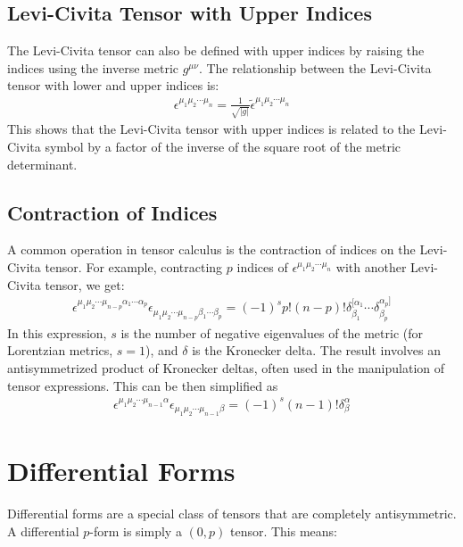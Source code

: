 \documentclass[12pt]{book}
\begin{document}
\subsection{Levi-Civita Tensor with Upper Indices}

The Levi-Civita tensor can also be defined with upper indices by raising the indices using the inverse metric \( g^{\mu\nu} \). The relationship between the Levi-Civita tensor with lower and upper indices is:
\begin{align}
\epsilon^{\mu_1 \mu_2 \cdots \mu_n} = \frac{1}{\sqrt{|g|}} \tilde{\epsilon}^{\mu_1 \mu_2 \cdots \mu_n}
\end{align}
This shows that the Levi-Civita tensor with upper indices is related to the Levi-Civita symbol by a factor of the inverse of the square root of the metric determinant.

\subsection{Contraction of Indices}

A common operation in tensor calculus is the contraction of indices on the Levi-Civita tensor. For example, contracting \( p \) indices of \( \epsilon^{\mu_1 \mu_2 \cdots \mu_n} \) with another Levi-Civita tensor, we get:
\begin{align}
\epsilon^{\mu_1 \mu_2 \cdots \mu_{n-p} \alpha_1 \cdots \alpha_p} \epsilon_{\mu_1 \mu_2 \cdots \mu_{n-p} \beta_1 \cdots \beta_p} = (-1)^s p! (n-p)! \delta^{[\alpha_1}_{\beta_1} \cdots \delta^{\alpha_p]}_{\beta_p}
\end{align}
In this expression, \( s \) is the number of negative eigenvalues of the metric (for Lorentzian metrics, \( s = 1 \)), and \( \delta \) is the Kronecker delta. The result involves an antisymmetrized product of Kronecker deltas, often used in the manipulation of tensor expressions. This can be then simplified as
\begin{align}
\epsilon^{\mu_1 \mu_2 \cdots \mu_{n-1} \alpha} \epsilon_{\mu_1 \mu_2 \cdots \mu_{n-1} \beta} = (-1)^s (n-1)! \delta^\alpha_\beta
\end{align}
\section{Differential Forms}

Differential forms are a special class of tensors that are completely antisymmetric. A differential \( p \)-form is simply a \( (0,p) \) tensor. This means:
\end{document}
